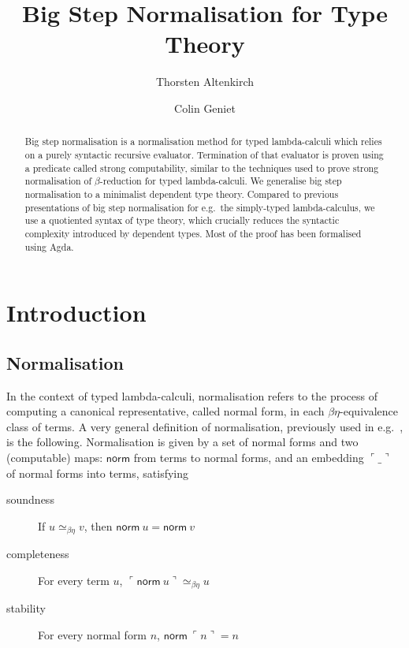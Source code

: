 \documentclass[a4paper,UKenglish,cleveref]{lipics-v2019}
\title{Big Step Normalisation for Type Theory}
\author{Thorsten Altenkirch}
{School for Computer Science, University of Nottingham, United Kingdom}
{txa@cs.nott.ac.uk}{}
{supported by COST Action EUTypes CA15123 and USAF, Airforce office for
  scientific research, award FA9550-16-1-0029}
\author{Colin Geniet}
{Computer Science Department, ENS Paris-Saclay, France}
{colin.geniet@ens-paris-saclay.fr}{}{}
\newcommand{\agdaSymb}[1]{\mathsf{#1}}
\newcommand{\norm}{\agdaSymb{norm}}
\newcommand{\cul}{\ulcorner}
\newcommand{\cur}{\urcorner}
\newcommand{\Beq}{\simeq_{\beta\eta}}
\begin{document}
\maketitle

\begin{abstract}
  Big step normalisation is a normalisation method for typed lambda-calculi
  which relies on a purely syntactic recursive evaluator. Termination of that
  evaluator is proven using a predicate called strong computability, similar to
  the techniques used to prove strong normalisation of $\beta$-reduction for
  typed lambda-calculi. We generalise big step normalisation to a minimalist
  dependent type theory. Compared to previous presentations of big step
  normalisation for e.g.\ the simply-typed lambda-calculus, we use a quotiented
  syntax of type theory, which crucially reduces the syntactic complexity
  introduced by dependent types. Most of the proof has been formalised using
  Agda.
\end{abstract}

\section{Introduction}
\subsection{Normalisation}
In the context of typed lambda-calculi, normalisation refers to the process of
computing a canonical representative, called normal form, in each
$\beta\eta$-equivalence class of terms.
A very general definition of normalisation, previously used in
e.g.~\cite{altenkirch1995categorical,chapman2009bsn,kaposi2016normalisation},
is the following.
Normalisation is given by a set of normal forms and two (computable) maps:
$\norm$ from terms to normal forms,
and an embedding $\cul\_\cur$ of normal forms into terms, satisfying

\begin{description}
\item[soundness] If $u \Beq v$, then $\norm\ u = \norm\ v$
\item[completeness\footnotemark] For every term $u$, $\cul \norm\ u \cur \Beq u$
\item[stability] For every normal form $n$, $\norm\ \cul n \cur = n$
\end{description}%
\end{document}
